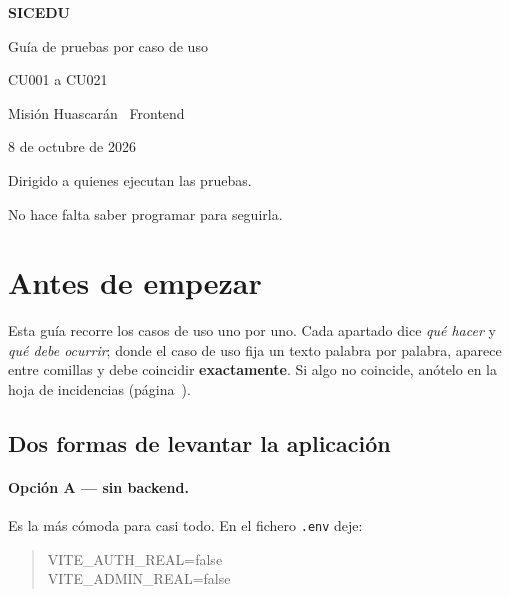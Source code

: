 \documentclass[11pt,a4paper]{article}
\begin{document}
\begin{titlepage}
\centering
\vspace*{3cm}
{\Huge\bfseries\color{azulmarino} SICEDU\par}
\vspace{0.4cm}
{\LARGE Guía de pruebas por caso de uso\par}
\vspace{0.3cm}
{\large CU001 a CU021\par}
\vspace{2cm}
{\large Misión Huascarán \textperiodcentered\ Frontend\par}
\vspace{0.3cm}
{\large 8 de octubre de 2026\par}
\vfill
{\normalsize Dirigido a quienes ejecutan las pruebas.\par}
{\normalsize No hace falta saber programar para seguirla.\par}
\end{titlepage}

\tableofcontents
\newpage

\section{Antes de empezar}

Esta guía recorre los casos de uso uno por uno. Cada apartado dice \emph{qué
hacer} y \emph{qué debe ocurrir}; donde el caso de uso fija un texto palabra por
palabra, aparece entre comillas y debe coincidir \textbf{exactamente}. Si algo
no coincide, anótelo en la hoja de incidencias (página~\pageref{sec:incidencias}).

\subsection{Dos formas de levantar la aplicación}

\paragraph{Opción A --- sin backend.} Es la más cómoda para casi todo. En el
fichero \texttt{.env} deje:

\begin{quote}\ttfamily
VITE\_AUTH\_REAL=false\\
VITE\_ADMIN\_REAL=false
\end{quote}
\end{document}
